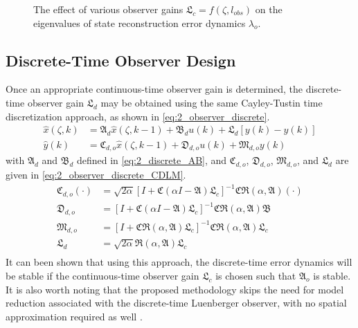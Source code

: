 \begin{figure}[!htbp]
    \centering
    
    \caption{The effect of various observer gains $\mathfrak{L}_c = f(\zeta, l_{obs})$ on the eigenvalues of state reconstruction error dynamics $\lambda_o$.}
    \label{fig:2_L_vs_lambda}
\end{figure}

\subsection{Discrete-Time Observer Design}
Once an appropriate continuous-time observer gain is determined, the discrete-time observer gain $\mathfrak{L}_d$ may be obtained using the same Cayley-Tustin time discretization approach, as shown in \eqref{eq:2_observer_discrete}.
\begin{equation} \label{eq:2_observer_discrete}
    \begin{aligned}
        {\hat{x}}(\zeta, k) &= \mathfrak{A}_d {\hat{x}}(\zeta, k-1) + \mathfrak{B}_d u(k) + \mathfrak{L}_d [y(k) - \hat{y}(k)] \\
        \hat{y}(k) &= \mathfrak{C}_{d,o} {\hat{x}}(\zeta, k-1) + \mathfrak{D}_{d,o} u(k) + \mathfrak{M}_{d,o} y(k)
    \end{aligned}
\end{equation}
with $\mathfrak{A}_d$ and $\mathfrak{B}_d$ defined in \eqref{eq:2_discrete_AB}, and $\mathfrak{C}_{d,o}$, $\mathfrak{D}_{d,o}$, $\mathfrak{M}_{d,o}$, and $\mathfrak{L}_d$ are given in \eqref{eq:2_observer_discrete_CDLM}.
\begin{equation} \label{eq:2_observer_discrete_CDLM}
    \begin{aligned}
        \mathfrak{C}_{d,o} (\cdot) &= \sqrt{2\alpha} \left[ I + \mathfrak{C} (\alpha I - \mathfrak{A}) \mathfrak{L}_c \right]^{-1} \mathfrak{C} \mathfrak{R}(\alpha, \mathfrak{A}) (\cdot) \\
        \mathfrak{D}_{d,o} &= \left[ I + \mathfrak{C} (\alpha I - \mathfrak{A}) \mathfrak{L}_c \right]^{-1} \mathfrak{C} \mathfrak{R}(\alpha, \mathfrak{A}) \mathfrak{B} \\
        \mathfrak{M}_{d,o} &= \left[ I + \mathfrak{C} \mathfrak{R}(\alpha, \mathfrak{A}) \mathfrak{L}_c \right]^{-1} \mathfrak{C} \mathfrak{R}(\alpha, \mathfrak{A}) \mathfrak{L}_c \\
        \mathfrak{L}_d &= \sqrt{2\alpha} \mathfrak{R}(\alpha, \mathfrak{A}) \mathfrak{L}_c \\
    \end{aligned}
\end{equation}
It can been shown that using this approach, the discrete-time error dynamics will be stable if the continuous-time observer gain $\mathfrak{L}_c$ is chosen such that $\mathfrak{A}_o$ is stable. It is also worth noting that the proposed methodology skips the need for model reduction associated with the discrete-time Luenberger observer, with no spatial approximation required as well \cite{dochain2000state,dochain2001state,alonso2004optimal,Ali2015Review,Khatibi2021Model}.

